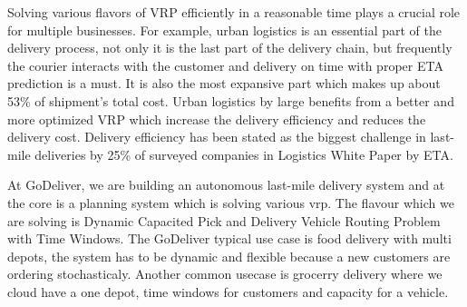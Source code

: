 Solving various flavors of \gls{VRP} efficiently in a reasonable time plays a crucial role for multiple businesses. For example, urban logistics is an essential part of the delivery process, not only it is the last part of the delivery chain, but frequently the courier interacts with the customer and delivery on time with proper ETA prediction is a must. It is also the most expansive part which makes up about 53\% of shipment’s total cost\cite{last-mile-cost}. Urban logistics by large benefits from a better and more optimized \gls{VRP} which increase the delivery efficiency and reduces the delivery cost. Delivery efficiency has been stated as the biggest challenge in last-mile deliveries by 25\% of surveyed companies in Logistics White Paper by ETA\cite{logistics-whitepaper}.

At GoDeliver, we are building an autonomous last-mile delivery system and at the core is a planning system which is solving various \gls{vrp}. The flavour which we are solving is Dynamic Capacited Pick and Delivery Vehicle Routing Problem with Time Windows. The GoDeliver typical use case is food delivery with multi depots, the system has to be dynamic and flexible because a new customers are ordering stochasticaly. Another common usecase is grocerry delivery where we cloud have a one depot, time windows for customers and capacity for a vehicle.